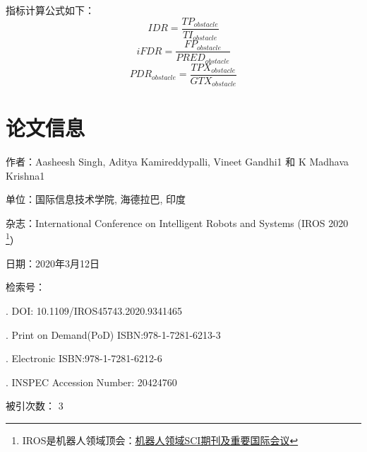 \documentclass[lang=cn,11pt]{elegantpaper}
\begin{document}
指标计算公式如下：
\begin{equation}
    \mathit{IDR} = \frac{TP_{obstacle}}{TI_{obstacle}}
\end{equation}
\begin{equation}
    \mathit{iFDR} = \frac{FP_{obstacle}}{PRED_{obstacle}}
\end{equation}
\begin{equation}
    \mathit{PDR_{obstacle}} = \frac{TPX_{obstacle}}{GTX_{obstacle}}
\end{equation}


\section{论文信息}

作者：Aasheesh Singh, Aditya Kamireddypalli, Vineet Gandhi1 和 K Madhava Krishna1

单位：国际信息技术学院, 海德拉巴, 印度

杂志：International Conference on Intelligent Robots and Systems (IROS 2020 \footnote{IROS是机器人领域顶会：\href{http://robot.buaa.edu.cn/info/1024/1047.htm}{机器人领域SCI期刊及重要国际会议}}）


日期：2020年3月12日

检索号：  

. DOI: 10.1109/IROS45743.2020.9341465   

. Print on Demand(PoD) ISBN:978-1-7281-6213-3  

. Electronic ISBN:978-1-7281-6212-6   

. INSPEC Accession Number: 20424760

被引次数： 3



\nocite{*}

%
\end{document}
